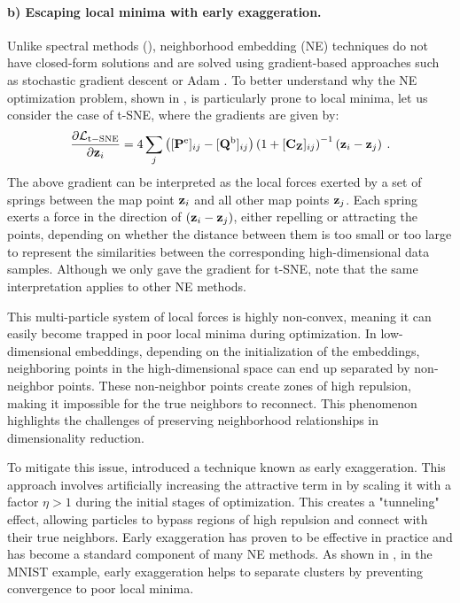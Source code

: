 \paragraph{b) Escaping local minima with early exaggeration.} Unlike spectral methods (), neighborhood embedding (NE) techniques do not have closed-form solutions and are solved using gradient-based approaches such as stochastic gradient descent or Adam \citep{kingma2014adam}. To better understand why the NE optimization problem, shown in , is particularly prone to local minima, let us consider the case of t-SNE, where the gradients are given by:
\begin{align}
    \frac{\partial \mathcal{L}_{\mathrm{t-SNE}}}{\partial {\mathbf{z}}_i} = 4 \sum_j \left( [{\mathbf{P}}^{\mathrm{e}}]_{ij} - [{\mathbf{Q}}^{\mathrm{b}}]_{ij} \right) \left(1 + [\mathbf{C}_{{\mathbf{Z}}}]_{ij}\right)^{-1} \left( {\mathbf{z}}_i - {\mathbf{z}}_j \right) \:.
\end{align}
The above gradient can be interpreted as the local forces exerted by a set of springs between the map point ${\mathbf{z}}_i$ and all other map points ${\mathbf{z}}_j$. Each spring exerts a force in the direction of $({\mathbf{z}}_i - {\mathbf{z}}_j)$, either repelling or attracting the points, depending on whether the distance between them is too small or too large to represent the similarities between the corresponding high-dimensional data samples. Although we only gave the gradient for t-SNE, note that the same interpretation applies to other NE methods.

This multi-particle system of local forces is highly non-convex, meaning it can easily become trapped in poor local minima during optimization. In low-dimensional embeddings, depending on the initialization of the embeddings, neighboring points in the high-dimensional space can end up separated by non-neighbor points. These non-neighbor points create zones of high repulsion, making it impossible for the true neighbors to reconnect. This phenomenon highlights the challenges of preserving neighborhood relationships in dimensionality reduction.

To mitigate this issue, \citet{van2008visualizing} introduced a technique known as early exaggeration. This approach involves artificially increasing the attractive term in  by scaling it with a factor $\eta > 1$ during the initial stages of optimization. This creates a "tunneling" effect, allowing particles to bypass regions of high repulsion and connect with their true neighbors. Early exaggeration has proven to be effective in practice and has become a standard component of many NE methods. As shown in , in the MNIST example, early exaggeration helps to separate clusters by preventing convergence to poor local minima.

